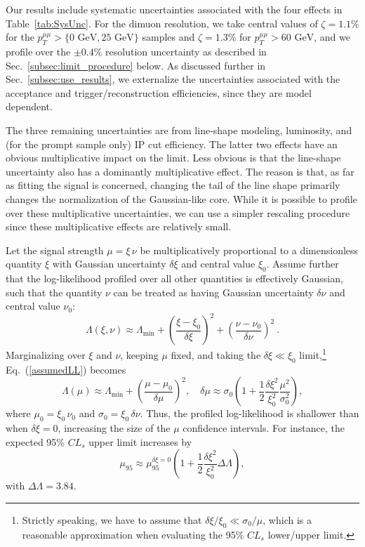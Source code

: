 \documentclass[aps,prd,twocolumn,superscriptaddress,preprintnumbers,nofootinbib,longbibliography,floatfix]{revtex4-1}
\newcommand{\ptmm}{p_T^{\mu\mu}}
\newcommand{\GeV}{\text{~GeV}}
\DeclareRobustCommand{\Sec}[1]{Sec.~\ref{#1}}
\DeclareRobustCommand{\Tab}[1]{Table~\ref{#1}}
\DeclareRobustCommand{\Eq}[1]{Eq.~(\ref{#1})}
\begin{document}
Our results include systematic uncertainties associated with the four effects in \Tab{tab:SysUnc}.
%
For the dimuon resolution, we take central values of $\zeta = 1.1\%$ for the $\ptmm > \{0 \GeV,25 \GeV\}$ samples and $\zeta = 1.3\%$ for $\ptmm > 60\GeV$, and we profile over the $\pm0.4\%$ resolution uncertainty as described in \Sec{subsec:limit_procedure} below.
%
As discussed further in \Sec{subsec:use_results}, we externalize the uncertainties associated with the acceptance and trigger/reconstruction efficiencies, since they are model dependent.


The three remaining uncertainties are from line-shape modeling, luminosity, and (for the prompt sample only) IP cut efficiency.
%
The latter two effects have an obvious multiplicative impact on the limit.
%
Less obvious is that the line-shape uncertainty also has a dominantly multiplicative effect.
%
The reason is that, as far as fitting the signal is concerned, changing the tail of the line shape primarily changes the normalization of the Gaussian-like core.
%
While it is possible to profile over these multiplicative uncertainties, we can use a simpler rescaling procedure since these multiplicative effects are relatively small.


Let the signal strength $\mu = \xi \, \nu$ be multiplicatively proportional to a dimensionless quantity $\xi$ with Gaussian uncertainty $\delta \xi$ and central value $\xi_0$.
%
Assume further that the log-likelihood profiled over all other quantities is effectively Gaussian, such that the quantity $\nu$ can be treated as having Gaussian uncertainty $\delta \nu$ and central value $\nu_0$:
%
\begin{equation}
\label{assumedLL}
\Lambda(\xi,\nu) \approx \Lambda_{\min} + \left(\frac{\xi-\xi_0}{\delta \xi} \right)^2 + \left(\frac{\nu-\nu_0}{\delta \nu} \right)^2 \ .
\end{equation}
%
Marginalizing over $\xi$ and $\nu$, keeping $\mu$ fixed, and taking the $\delta \xi \ll  \xi_0$ limit,\footnote{Strictly speaking, we have to assume that $\delta \xi / \xi_0 \ll \sigma_0 / \mu$, which is a reasonable approximation when evaluating the 95\% $CL_s$ lower/upper limit.} \Eq{assumedLL} becomes
%
\begin{equation}
\Lambda(\mu) \approx \Lambda_{\min} + \left(\frac{\mu-\mu_0}{\delta \mu}\right)^2, \quad \delta \mu \approx \sigma_0  \left(1 + \frac{1}{2} \frac{\delta \xi^2}{\xi_0^2} \frac{\mu^2}{\sigma_0^2} \right),
\end{equation}
%
where $\mu_0 = \xi_0 \, \nu_0$ and $\sigma_0 = \xi_0 \, \delta \nu$.
%
Thus, the profiled log-likelihood is shallower than when $\delta \xi = 0$, increasing the size of the $\mu$ confidence intervals.
%
For instance, the expected 95\% $CL_s$ upper limit  increases by
%
\begin{equation}
\label{eq:rescaling_trick}
\mu_{95} \approx \mu_{95}^{\delta \xi = 0} \left( 1 + \frac{1}{2}  \frac{\delta \xi^2}{\xi_0^2}{\Delta \Lambda} \right),
\end{equation}
%
with $\Delta \Lambda = 3.84$.
\end{document}
